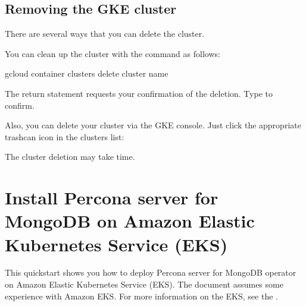 \documentclass[letterpaper,10pt,english]{sphinxmanual}
\begin{document}
\section{Removing the GKE cluster}
\label{\detokenize{gke:removing-the-gke-cluster}}
There are several ways that you can delete the cluster.

You can clean up the cluster with the  command as follows:

\begin{sphinxVerbatim}[commandchars=\\\{\}]
gcloud container clusters delete \PYGZlt{}cluster name\PYGZgt{}
\end{sphinxVerbatim}

The return statement requests your confirmation of the deletion. Type  to confirm.

Also, you can delete your cluster via the GKE console. Just click the appropriate trashcan icon in the clusters list:


The cluster deletion may take time.


\chapter{Install Percona server for MongoDB on Amazon Elastic Kubernetes Service (EKS)}
\label{\detokenize{eks:install-percona-server-for-mongodb-on-amazon-elastic-kubernetes-service-eks}}\label{\detokenize{eks::doc}}
This quickstart shows you how to deploy Percona server for MongoDB operator on Amazon Elastic Kubernetes Service (EKS). The document assumes some experience with Amazon EKS. For more information on the EKS, see the .
\end{document}
